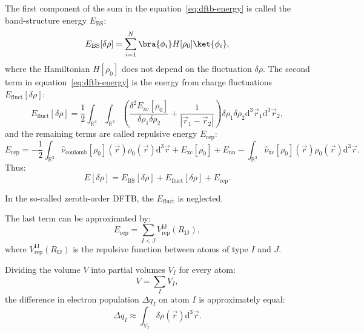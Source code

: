 The first component of the sum in the equation~\ref{eq:dftb-energy} is called the band-structure energy $E_{\text{BS}}$:
\begin{equation}
    E_{\text{BS}}[\delta \rho] = \sum_{i = 1}^N \bra{\phi_i} H[\rho_0] \ket{\phi_i},
\end{equation}
where the Hamiltonian $H[\rho_0]$ does not depend on the fluctuation $\delta \rho$. The second term in equation~\ref{eq:dftb-energy} is the energy from charge fluctuations $E_{\text{fluct}}[\delta \rho]$:
\begin{equation}
    E_{\text{fluct}}[\delta \rho] = \frac{1}{2} \int_{\mathbb{R}^3} \int_{\mathbb{R}^3} \left( \frac{\delta^2 E_{\text{xc}}[\rho_0]}{\delta \rho_1 \delta \rho_2} + \frac{1}{\left| \vec{r}_1 - \vec{r}_2 \right|} \right) \delta \rho_1 \delta \rho_2 \text{d}^3\vec{r}_1 \text{d}^3\vec{r}_2,
\end{equation}
and the remaining terms are called repulsive energy $E_{\text{rep}}$:
\begin{equation}
    E_{\text{rep}} = - \frac{1}{2} \int_{\mathbb{R}^3} \hat{\nu}_{\text{coulomb}}[\rho_0](\vec{r}) \rho_0(\vec{r}) \text{d}^3\vec{r} + E_{\text{xc}}[\rho_0] + E_{\text{nn}} - \int_{\mathbb{R}^3} \hat{\nu}_{\text{xc}}[\rho_0](\vec{r}) \rho_0(\vec{r}) \text{d}^3\vec{r}.
\end{equation}
Thus:
\begin{equation}
    E[\delta \rho] = E_{\text{BS}}[\delta \rho] + E_{\text{fluct}}[\delta \rho] + E_{\text{rep}}.
    \label{eq:energy-dftb}
\end{equation}

In the so-called zeroth-order DFTB, the $E_{\text{fluct}}$ is neglected.

The last term can be approximated by:
\begin{equation}
    E_{\text{rep}} = \sum_{I < J} V_{\text{rep}}^{{\text{IJ}}}(R_{\text{IJ}}),
\end{equation}
where $V_{\text{rep}}^{{\text{IJ}}}(R_{\text{IJ}})$ is the repulsive function between atoms of type $I$ and $J$.

Dividing the volume $V$ into partial volumes $V_I$ for every atom:
\begin{equation}
    V = \sum_I V_I,
\end{equation}
the difference in electron population $\Delta q_I$ on atom $I$ is approximately equal:
\begin{equation}
    \Delta q_I \approx \int_{V_I} \delta \rho(\vec{r}) \text{d}^3 \vec{r}.
\end{equation}

